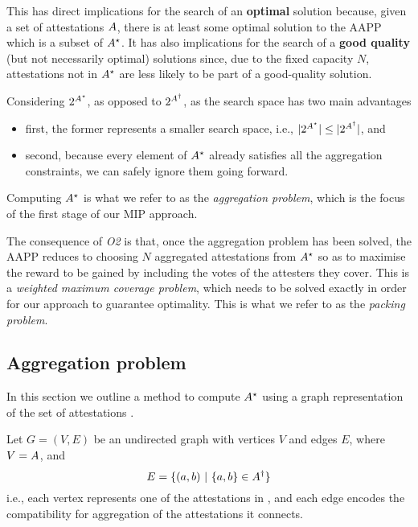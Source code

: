 \documentclass{article}
\begin{document}
This has direct implications for the search of an \textbf{optimal} solution
because, given a set of attestations $A{}$, there is at least some
optimal solution \solution{} to the AAPP which is a subset of
$A^{\star}$.  It has also implications for the search of a
\textbf{good quality} (but not necessarily optimal) solutions since, due to the
fixed capacity $N$, attestations not in $A^{\star}$ are less likely
to be part of a good-quality solution.

Considering $2^{A^{\star}}$, as opposed to
$2^{A^{\dagger}}$, as the search space has two main advantages
%
\begin{itemize}
  \item first, the former represents a smaller search space, i.e.,
  $|2^{A^{\star}}| \leq |2^{A^{\dagger}}|$, and
  \item second, because every element of ${A^{\star}}$ already
  satisfies all the aggregation constraints, we can safely ignore them going
  forward.
\end{itemize}
%
Computing $A^{\star}$ is what we refer to as the \emph{aggregation
problem}, which is the focus of the first stage of our MIP approach.

The consequence of \emph{O2} is that, once the aggregation problem has been
solved, the AAPP reduces to choosing $N$ aggregated attestations from
$A^{\star}$ so as to maximise the reward to be gained by including
the votes of the attesters they cover. This is a \emph{weighted maximum
coverage problem}, which needs to be solved exactly in order for our approach
to guarantee optimality. This is what we refer to as the \emph{packing
problem}.

\subsection{Aggregation problem} \label{sec:clique}

In this section we outline a method to compute $A^{\star}$ using a
graph representation of the set of attestations \attestations{}.

Let $G = (V,E)$ be an undirected graph with vertices $V$ and edges $E$, where
$V = A$, and 
%
\begin{equation} 
  E = \{ (a, b)~|~\{a, b\} \in A^{\dagger} \}
\end{equation}
%
i.e., each vertex represents one of the attestations in \attestations{}, and each
edge encodes the compatibility for aggregation of the attestations it connects. 
\end{document}
